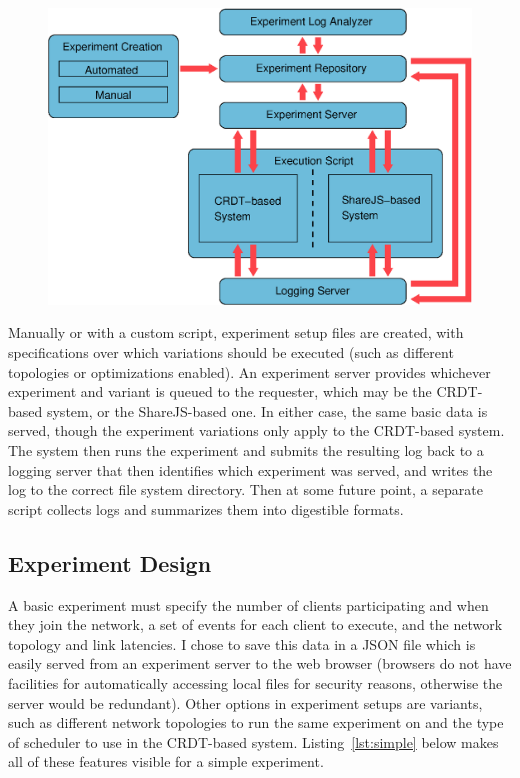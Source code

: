 \documentclass[12pt,a4paper,twoside,openright]{report}
\begin{document}
	\begin{figure}[htb]
	\centering
	\includegraphics[width=1\linewidth]{figs/workflow.eps}
	\caption[Workflow]{}
	\label{fig:workflow}
	\end{figure}

	
	
	Manually or with a custom script, experiment setup files are created, with specifications over which variations should be executed (such as different topologies or optimizations enabled). An experiment server provides whichever experiment and variant is queued to the requester, which may be the CRDT-based system, or the ShareJS-based one. In either case, the same basic data is served, though the experiment variations only apply to the CRDT-based system. The system then runs the experiment and submits the resulting log back to a logging server that then identifies which experiment was served, and writes the log to the correct file system directory. Then at some future point, a separate script collects logs and summarizes them into digestible formats.

	\subsection{Experiment Design}
	
	A basic experiment must specify the number of clients participating and when they join the network, a set of events for each client to execute, and the network topology and link latencies. I chose to save this data in a JSON file which is easily served from an experiment server to the web browser (browsers do not have facilities for automatically accessing local files for security reasons, otherwise the server would be redundant). Other options in experiment setups are variants, such as different network topologies to run the same experiment on and the type of scheduler to use in the CRDT-based system.	Listing~\ref{lst:simple} below makes all of these features visible for a simple experiment.
	
\end{document}
